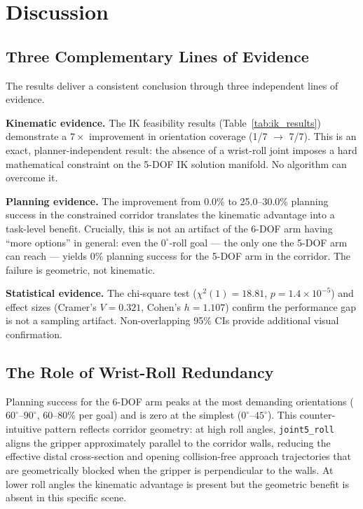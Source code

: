\documentclass[conference]{IEEEtran}
\begin{document}
	
	\section{Discussion}
	\label{sec:discussion}
	
	\subsection{Three Complementary Lines of Evidence}
	
	The results deliver a consistent conclusion through three
	independent lines of evidence.
	
	\textbf{Kinematic evidence.}
	The IK feasibility results (Table~\ref{tab:ik_results})
	demonstrate a $7\times$ improvement in orientation coverage
	(1/7 $\rightarrow$ 7/7). This is an exact, planner-independent
	result: the absence of a wrist-roll joint imposes a hard
	mathematical constraint on the 5-DOF IK solution manifold.
	No algorithm can overcome it.
	
	\textbf{Planning evidence.}
	The improvement from 0.0\% to 25.0--30.0\% planning success
	in the constrained corridor translates the kinematic advantage
	into a task-level benefit. Crucially, this is not an artifact
	of the 6-DOF arm having ``more options'' in general: even the
	$0^\circ$-roll goal — the only one the 5-DOF arm can reach —
	yields 0\% planning success for the 5-DOF arm in the corridor.
	The failure is geometric, not kinematic.
	
	\textbf{Statistical evidence.}
	The chi-square test ($\chi^2(1) = 18.81$, $p = 1.4\times10^{-5}$)
	and effect sizes (Cramer's $V = 0.321$, Cohen's $h = 1.107$)
	confirm the performance gap is not a sampling artifact.
	Non-overlapping 95\% CIs provide additional visual confirmation.
	
	\subsection{The Role of Wrist-Roll Redundancy}
	
	Planning success for the 6-DOF arm peaks at the most
	demanding orientations ($60^\circ$--$90^\circ$, 60--80\%
	per goal) and is zero at the simplest ($0^\circ$--$45^\circ$).
	This counter-intuitive pattern reflects corridor geometry:
	at high roll angles, \texttt{joint5\_roll} aligns the gripper
	approximately parallel to the corridor walls, reducing the
	effective distal cross-section and opening collision-free
	approach trajectories that are geometrically blocked when
	the gripper is perpendicular to the walls. At lower roll
	angles the kinematic advantage is present but the geometric
	benefit is absent in this specific scene.
	
\end{document}
